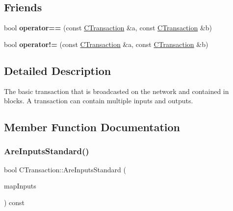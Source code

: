 \subsection*{Friends}
\begin{DoxyCompactItemize}
\item 
\mbox{\label{class_c_transaction_a1afe3b8f0f0daca6f653756ee44c9e44}} 
bool {\bfseries operator==} (const \mbox{\hyperlink{class_c_transaction}{C\+Transaction}} \&a, const \mbox{\hyperlink{class_c_transaction}{C\+Transaction}} \&b)
\item 
\mbox{\label{class_c_transaction_ab7c00027d7a2622792736f6a3a579d5d}} 
bool {\bfseries operator!=} (const \mbox{\hyperlink{class_c_transaction}{C\+Transaction}} \&a, const \mbox{\hyperlink{class_c_transaction}{C\+Transaction}} \&b)
\end{DoxyCompactItemize}


\subsection{Detailed Description}
The basic transaction that is broadcasted on the network and contained in blocks. A transaction can contain multiple inputs and outputs. 

\subsection{Member Function Documentation}
\mbox{\label{class_c_transaction_a48850ab313a08578c7cf91715eec1730}} 
\subsubsection{\texorpdfstring{AreInputsStandard()}{AreInputsStandard()}}
{\footnotesize\ttfamily bool C\+Transaction\+::\+Are\+Inputs\+Standard (\begin{DoxyParamCaption}\item[{const Map\+Prev\+Tx \&}]{map\+Inputs }\end{DoxyParamCaption}) const}

